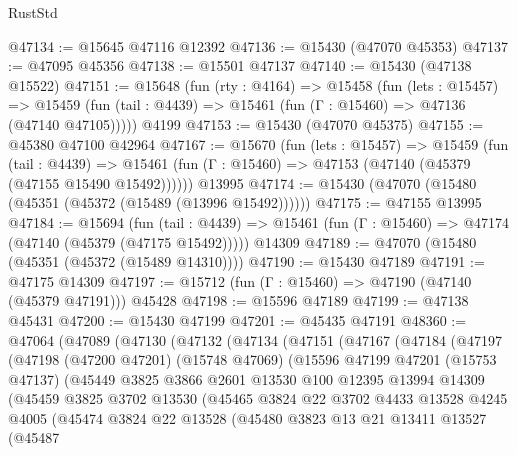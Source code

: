 \begin{lexlean}{RustStd}
\begin{coremodule}
{\begin{coremodule}
{{{{{{{{{{{{{{{{{{{{{{{{{{{{{{{{{{{{{{{{{{{{{{{{{{{{{{{{{{{{@47134 := @15645 @47116 @12392
@47136 := @15430 (@47070 @45353)
@47137 := @47095 @45356
@47138 := @15501 @47137
@47140 := @15430 (@47138 @15522)
@47151 := @15648
    (fun (rty : @4164) =>
    @15458
      (fun (lets : @15457) =>
      @15459 (fun (tail : @4439) => @15461 (fun (Γ : @15460) => @47136 (@47140 @47105)))))
    @4199
@47153 := @15430 (@47070 @45375)
@47155 := @45380 @47100 @42964
@47167 := @15670
    (fun (lets : @15457) =>
    @15459
      (fun (tail : @4439) =>
      @15461 (fun (Γ : @15460) => @47153 (@47140 (@45379 (@47155 @15490 @15492))))))
    @13995
@47174 := @15430 (@47070 (@15480 (@45351 (@45372 (@15489 (@13996 @15492))))))
@47175 := @47155 @13995
@47184 := @15694
    (fun (tail : @4439) => @15461 (fun (Γ : @15460) => @47174 (@47140 (@45379 (@47175 @15492)))))
    @14309
@47189 := @47070 (@15480 (@45351 (@45372 (@15489 @14310))))
@47190 := @15430 @47189
@47191 := @47175 @14309
@47197 := @15712 (fun (Γ : @15460) => @47190 (@47140 (@45379 @47191))) @45428
@47198 := @15596 @47189
@47199 := @47138 @45431
@47200 := @15430 @47199
@47201 := @45435 @47191
@48360 := @47064
    (@47089
      (@47130
        (@47132
          (@47134
            (@47151
              (@47167
                (@47184
                  (@47197
                    (@47198
                      (@47200 @47201)
                      (@15748 @47069)
                      (@15596
                        @47199
                        @47201
                        (@15753 @47137)
                        (@45449
                          @3825
                          @3866
                          @2601
                          @13530
                          @100
                          @12395
                          @13994
                          @14309
                          (@45459
                            @3825
                            @3702
                            @13530
                            (@45465
                              @3824
                              @22
                              @3702
                              @4433
                              @13528
                              @4245
                              @4005
                              (@45474
                                @3824
                                @22
                                @13528
                                (@45480
                                  @3823
                                  @13
                                  @21
                                  @13411
                                  @13527
                                  (@45487
}}}}}}}}}}}}}}}}}}}}}}}}}}}}}}}}}}}}}}}}}}}}}}}}}}}}}}}}}}}}
\end{coremodule}}
\end{coremodule}
\end{lexlean}
